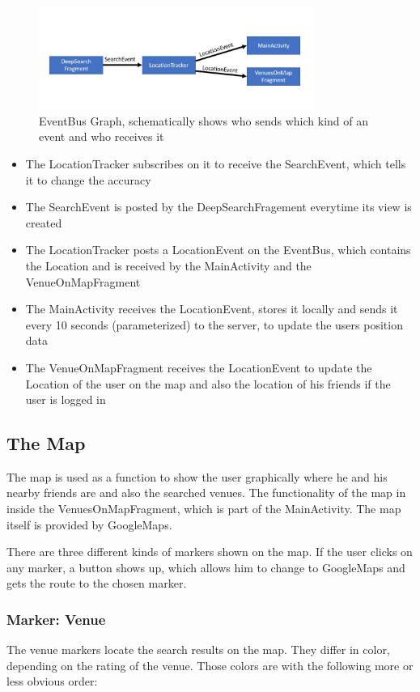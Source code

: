 \begin{figure}[htbp]
	\includegraphics[width=0.8\textwidth]{images/eventBus.jpg}
	\centering
	\caption[]{EventBus Graph, schematically shows who sends which kind of an event and who receives it}
	\label{fig:eventbus}
\end{figure} 


\begin{itemize}
\item The LocationTracker subscribes on it to receive the SearchEvent, which tells it to change the accuracy
\item The SearchEvent is posted by the DeepSearchFragement everytime its view is created
\item The LocationTracker posts a LocationEvent on the EventBus, which contains the Location and is received by the MainActivity and the VenueOnMapFragment
\item The MainActivity receives the LocationEvent, stores it locally and sends it every 10 seconds (parameterized) to the server, to update the users position data
\item The VenueOnMapFragment receives the LocationEvent to update the Location of the user on the map and also the location of his friends if the user is logged in
\end{itemize}

\subsection{The Map}
The map is used as a function to show the user graphically where he and his nearby friends are and also the searched venues. The functionality of the map in inside the VenuesOnMapFragment, which is part of the MainActivity. The map itself is provided by GoogleMaps.

There are three different kinds of markers shown on the map. If the user clicks on any marker, a button shows up, which allows him to change to GoogleMaps and gets the route to the chosen marker. 

\subsubsection{Marker: Venue}
The venue markers locate the search results on the map. They differ in color, depending on the rating of the venue. Those colors are with the following more or less obvious order:

